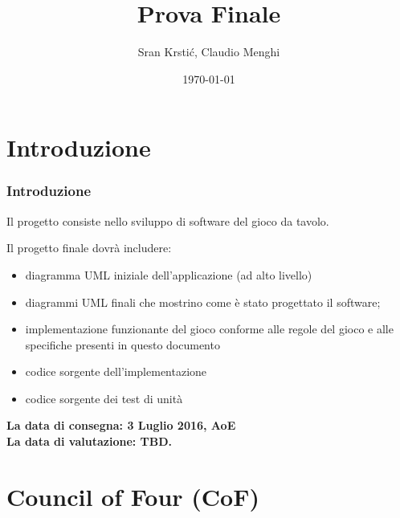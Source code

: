 \documentclass{beamer}
\title[Prova Finale]{Prova Finale} %
\author{Sr\dj{}an Krsti\'c, Claudio Menghi} %
\institute[] %
{
Politecnico di Milano \\ %
\medskip
\textit{srdan.krstic@polimi.it, claudio.menghi@polimi.it} %
}
\date{\today} %
\begin{document}
\begin{frame}
\titlepage %
\end{frame}





\section{Introduzione}
\begin{frame}
\frametitle{Introduzione}
Il progetto consiste nello sviluppo di software del gioco da tavolo.

Il progetto finale dovr\` a includere:
\begin{itemize}
\item diagramma UML iniziale dell'applicazione  (ad alto livello)
\item diagrammi UML finali che mostrino come \`e stato progettato il software;
\item implementazione funzionante del gioco conforme alle regole del gioco e alle specifiche presenti in questo documento
\item codice sorgente dell'implementazione
\item codice sorgente dei test di unit\`a
\end{itemize}
\textbf{La data di consegna: 3 Luglio 2016, AoE}\\
\textbf{La data di valutazione: TBD.}
\end{frame}


{
%
\section{Council of Four (CoF)}
\begin{frame}[plain]


\end{frame}
}
\end{document}
